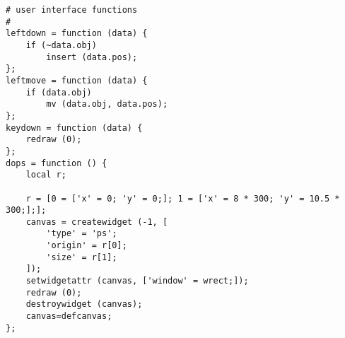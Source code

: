 \begin{verbatim}
# user interface functions
#
leftdown = function (data) {
    if (~data.obj)
        insert (data.pos);
};
leftmove = function (data) {
    if (data.obj)
        mv (data.obj, data.pos);
};
keydown = function (data) {
    redraw (0);
};
dops = function () {
    local r;

    r = [0 = ['x' = 0; 'y' = 0;]; 1 = ['x' = 8 * 300; 'y' = 10.5 * 300;];];
    canvas = createwidget (-1, [
        'type' = 'ps';
        'origin' = r[0];
        'size' = r[1];
    ]);
    setwidgetattr (canvas, ['window' = wrect;]);
    redraw (0);
    destroywidget (canvas);
    canvas=defcanvas;
};
\end{verbatim}
